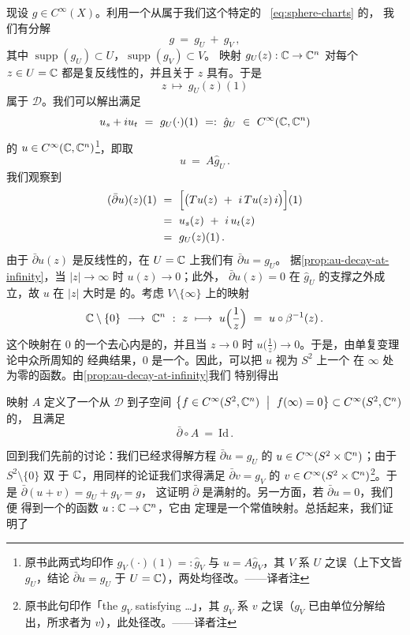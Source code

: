 现设 $g\in C^{\infty}(X)$。利用一个从属于我们这个特定的\trAtlas{}~%
\eqref{eq:sphere-charts} 的\trPartitionOfUnity{}，%
我们有分解
\[
g\ =\ g_{U}\ +\ g_{V}\,,
\]
其中 $\operatorname{supp}(g_{U})\subset U$，$\operatorname{supp}(g_{V})\subset V$。%
映射 $g_{U}(z):\mathbb{C}\to\mathbb{C}^{n}$ 对每个 $z\in U=\mathbb{C}$ 都是复反线性的，并且关于 $z$ %
具有\trCompactSupport。于是
\[
z\ \longmapsto\ g_{U}(z)(1)
\]
属于 $\mathcal{D}$。我们可以解出满足
\[
u_{s}+iu_{t}\ =\ g_{U}(\cdot)(1)\ =:\ \hat{g}_{U}\ \in\ C^{\infty}(\C,\C^{n})
\]
的 $u\in C^{\infty}(\mathbb{C},\mathbb{C}^{n})$\footnote{原书此两式均印作 $g_{V}(\cdot)(1)=:\hat{g}_{V}$ 与 $u=A\hat{g}_{V}$，其 $V$ 系 $U$ 之误（上下文皆 $g_{U}$，结论 $\bar{\partial}u=g_{U}$ 于 $U=\mathbb{C}$），两处均径改。——译者注}，即取
\[
u\ =\ A\hat{g}_{U}\,.
\]
我们观察到
\begin{align*}
(\bar{\partial}u)(z)(1)\ &=\ \Bigl[\bigl(Tu(z)\ +\ i\,Tu(z)\,i\bigr)\Bigr](1)\\
&=\ u_{s}(z)\ +\ i\,u_{t}(z)\\
&=\ g_{U}(z)(1)\,.
\end{align*}
由于 $\bar{\partial}u(z)$ 是反线性的，在 $U=\mathbb{C}$ 上我们有 $\bar{\partial}u=g_{U}$。%
据\cref{prop:au-decay-at-infinity}，当 $|z|\to\infty$ 时 $u(z)\to0$；此外，%
$\bar{\partial}u(z)=0$ 在 $\hat{g}_{U}$ 的支撑之外成立，故 $u$ 在 $|z|$ 大时是%
\trHolomorphic{}的。考虑 $V\setminus\{\infty\}$ 上的映射
\[
\C\setminus\{0\}\ \longrightarrow\ \C^{n}\ :\ z\ \longmapsto\ u\Bigl(\frac{1}{z}\Bigr)\ =\ u\circ\beta^{-1}(z)\,.
\]
这个映射在 $0$ 的一个去心\trNeighborhood{}内是\trHolomorphic{}的，并且当%
 $z\to0$ 时 $u\bigl(\frac{1}{z}\bigr)\to0$。于是，由单复变理论中众所周知的%
经典结果，$0$ 是一个\trRemovableSingularity。因此，可以把 $u$ 视为 $S^{2}$ 上一个%
在 $\infty$ 处为零的\trSmooth{}函数。由\cref{prop:au-decay-at-infinity}我们%
特别得出

\begin{proposition}\label{prop:extend-a-to-sphere}
映射 $A$ 定义了一个从 $\mathcal{D}$ 到子空间 $\bigl\{f\in C^{\infty}(S^{2},\mathbb{C}^{n})\ \bigm|\ f(\infty)=0\bigr\}\subset C^{\infty}(S^{2},\mathbb{C}^{n})$ 的\trLinearOperator，%
且满足
\[
\bar{\partial}\circ A\ =\ \mathrm{Id}\,.
\]
\end{proposition}

回到我们先前的讨论：我们已经求得解方程 $\bar{\partial}u=g_{U}$ 的%
 $u\in C^{\infty}(S^{2}\times\mathbb{C}^{n})$；由于 $S^{2}\setminus\{0\}$ 双%
\trHolomorphic{}于 $\mathbb{C}$，用同样的论证我们求得满足 $\bar{\partial}v=g_{V}$ 的%
 $v\in C^{\infty}(S^{2}\times\mathbb{C}^{n})$\footnote{原书此句印作「the $g_{V}$ satisfying …」，其 $g_{V}$ 系 $v$ 之误（$g_{V}$ 已由单位分解给出，所求者为 $v$），此处径改。——译者注}。于是 $\bar{\partial}(u+v)=g_{U}+g_{V}=g$，%
这证明 $\bar{\partial}$ 是满射的。另一方面，若 $\bar{\partial}u=0$，我们便%
得到一个\trBounded{}的\trHolomorphic{}函数 $u:\mathbb{C}\to\mathbb{C}^{n}$，它由%
\trLiouville{}定理是一个常值映射。总括起来，我们证明了

